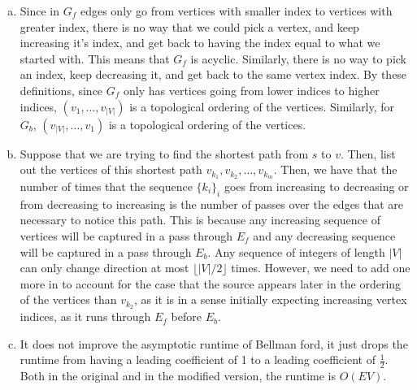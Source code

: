 \documentclass{article}
\begin{document}
\begin{enumerate}[a.]
\item
Since in $G_f$ edges only go from vertices with smaller index to vertices with greater index, there is no way that we could pick a vertex, and keep increasing it's index, and get back to having the index equal to what we started with. This means that $G_f$ is acyclic. Similarly, there is no way to pick an index, keep decreasing it, and get back to the same vertex index. By these definitions, since $G_f$ only has vertices going from lower indices to higher indices, $(v_1, \ldots,v_{|V|})$ is a topological ordering of the vertices. Similarly, for $G_b$, $(v_{|V|},\ldots,v_1)$ is a topological ordering of the vertices.

\item
Suppose that we are trying to find the shortest path from $s$ to $v$. Then, list out the vertices of this shortest path $v_{k_1}, v_{k_2}, \ldots, v_{k_m}$. Then, we have that the number of times that the sequence $\{k_i\}_i$ goes from increasing to decreasing or from decreasing to increasing is the number of passes over the edges that are necessary to notice this path. This is because any increasing sequence of vertices will be captured in a pass through $E_f$ and any decreasing sequence will be captured in a pass through $E_b$. Any sequence of integers of length $|V|$ can only change direction at most $\lfloor |V|/2\rfloor$ times. However, we need to add one more in to account for the case that the source appears later in the ordering of the vertices than $v_{k_2}$, as it is in a sense initially expecting increasing vertex indices, as it runs through $E_f$ before $E_b$.

\item
It does not improve the asymptotic runtime of Bellman ford, it just drops the runtime from having a leading coefficient of 1 to a leading coefficient of $\frac{1}{2}$. Both in the original and in the modified version, the runtime is $O(EV)$.
\end{enumerate}
\end{document}
